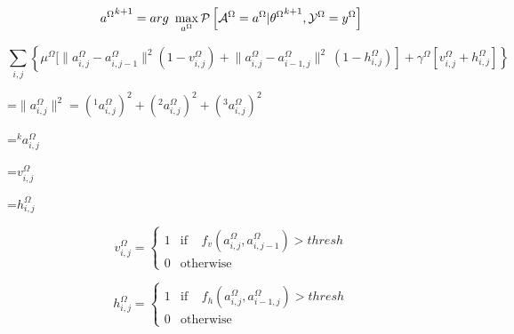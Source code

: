 {\newpage
\clearpage
\samepage \begin{equation}%
{a^\Omega}^{k+1}=arg\ \max_{a^\Omega}
\P \left [ \X^\Omega=a^\Omega | {\theta^\Omega}^{k+1}, \Y^\Omega=y^\Omega 
\right ] \label{eq:un_sup_restoration}
\end{equation}
}

{\newpage
\clearpage
\samepage \begin{equation}\sum_{i,j}  \left\{  \mu^\Omega  [   \|a^\Omega_{i,j}-a^\Omega_{i,j-1} \|^2
(1-v^\Omega_{i,j})   \right .
+ \left .  \|a^\Omega_{i,j}-a^\Omega_{i-1,j} \|^2 \ 
(1-h^\Omega_{i,j})     
\right ]
+  \left.  \gamma^\Omega  [  v^\Omega_{i,j} + h^\Omega_{i,j}  ]  \right\}
\label{eq:energy}
\end{equation}
}

{\newpage
\clearpage
\samepage \setbox\sizebox=\hbox{$
\|a^\Omega_{i,j} \|^2 = 
(^1a^\Omega_{i,j})^2+(^2a^\Omega_{i,j})^2+(^3a^\Omega_{i,j})^2 
$}\box\sizebox
}

{\newpage
\clearpage
\samepage \setbox\sizebox=\hbox{$^ka^\Omega_{i,j}$}\box\sizebox
}

{\newpage
\clearpage
\samepage \setbox\sizebox=\hbox{$v^\Omega_{i,j}$}\box\sizebox
}

{\newpage
\clearpage
\samepage \setbox\sizebox=\hbox{$h^\Omega_{i,j}$}\box\sizebox
}

{\newpage
\clearpage
\samepage \begin{displaymath}v^\Omega_{i,j}= \left \{ \begin{array}{cl}
                    1& \mbox{if} \;\;\;\; 
f_v(a_{i,j}^\Omega, a_{i,j-1}^\Omega) > thresh  \\ 
                    0 & \mbox{otherwise}
                    \end{array}
                 \right .
\end{displaymath}
}

{\newpage
\clearpage
\samepage \begin{displaymath}h^\Omega_{i,j}= \left \{ \begin{array}{cl}
                    1& \mbox{if} \;\;\;\; 
f_h(a_{i,j}^\Omega, a_{i-1,j}^\Omega) > thresh  \\ 
                    0 & \mbox{otherwise}
                    \end{array}
                 \right .
\end{displaymath}
}

